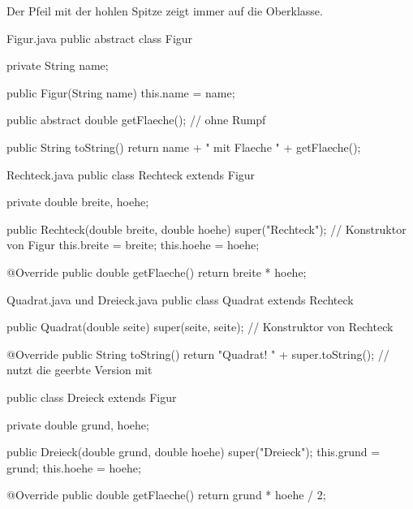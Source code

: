 \beispiele
{}
\begin{center}

\smallskip
{\small Der Pfeil mit der hohlen Spitze zeigt immer auf die Oberklasse.}
\end{center}
\begin{javacode}{Figur.java}
public abstract class Figur {
	private String name;

	public Figur(String name) {
		this.name = name;
	}

	public abstract double getFlaeche();    // ohne Rumpf

	public String toString() {
		return name + " mit Flaeche " + getFlaeche();
	}
}
\end{javacode}
\begin{javacode}{Rechteck.java}
public class Rechteck extends Figur {
	private double breite, hoehe;

	public Rechteck(double breite, double hoehe) {
		super("Rechteck");      // Konstruktor von Figur
		this.breite = breite;
		this.hoehe = hoehe;
	}

	@Override
	public double getFlaeche() {
		return breite * hoehe;
	}
}
\end{javacode}
\begin{javacode}{Quadrat.java und Dreieck.java}
public class Quadrat extends Rechteck {
	public Quadrat(double seite) {
		super(seite, seite);                            // Konstruktor von Rechteck
	}

	@Override
	public String toString() {
		return "Quadrat! " + super.toString();          // nutzt die geerbte Version mit
	}
}

public class Dreieck extends Figur {
	private double grund, hoehe;

	public Dreieck(double grund, double hoehe) {
		super("Dreieck");
		this.grund = grund;
		this.hoehe = hoehe;
	}

	@Override
	public double getFlaeche() {
		return grund * hoehe / 2;
	}
}
\end{javacode}
